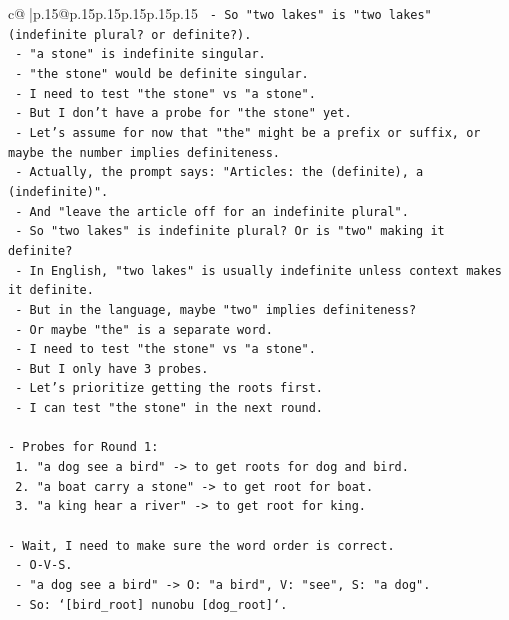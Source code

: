 \documentclass{article}
\begin{document}
{\begin{supertabular}{c@{$\;$}|p{.15\linewidth}@{}p{.15\linewidth}p{.15\linewidth}p{.15\linewidth}p{.15\linewidth}p{.15\linewidth}}
{{{\texttt{  {-} So "two lakes" is "two lakes" (indefinite plural? or definite?).} \\
\texttt{  {-} "a stone" is indefinite singular.} \\
\texttt{  {-} "the stone" would be definite singular.} \\
\texttt{  {-} I need to test "the stone" vs "a stone".} \\
\texttt{  {-} But I don't have a probe for "the stone" yet.} \\
\texttt{  {-} Let's assume for now that "the" might be a prefix or suffix, or maybe the number implies definiteness.} \\
\texttt{  {-} Actually, the prompt says: "Articles: the (definite), a (indefinite)".} \\
\texttt{  {-} And "leave the article off for an indefinite plural".} \\
\texttt{  {-} So "two lakes" is indefinite plural? Or is "two" making it definite?} \\
\texttt{  {-} In English, "two lakes" is usually indefinite unless context makes it definite.} \\
\texttt{  {-} But in the language, maybe "two" implies definiteness?} \\
\texttt{  {-} Or maybe "the" is a separate word.} \\
\texttt{  {-} I need to test "the stone" vs "a stone".} \\
\texttt{  {-} But I only have 3 probes.} \\
\texttt{  {-} Let's prioritize getting the roots first.} \\
\texttt{  {-} I can test "the stone" in the next round.} \\
\\ 
\texttt{{-} Probes for Round 1:} \\
\texttt{  1. "a dog see a bird" {-}> to get roots for dog and bird.} \\
\texttt{  2. "a boat carry a stone" {-}> to get root for boat.} \\
\texttt{  3. "a king hear a river" {-}> to get root for king.} \\
\\ 
\texttt{{-} Wait, I need to make sure the word order is correct.} \\
\texttt{  {-} O{-}V{-}S.} \\
\texttt{  {-} "a dog see a bird" {-}> O: "a bird", V: "see", S: "a dog".} \\
\texttt{  {-} So: `{[}bird\_root{]} nunobu {[}dog\_root{]}`.} \\
}}}
\end{supertabular}}
\end{document}
